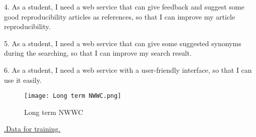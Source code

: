 \documentclass[
10pt, %
a4paper, %
oneside, %
headinclude,footinclude, %
BCOR5mm, %
]{scrartcl}
\begin{document}
4. As a student, I need a web service that can give feedback and suggest some good reproducibility articles as references, so that I can improve my article reproducibility.

5. As a student, I need a web service that can give some suggested synonyms during the searching, so that I can improve my search result.

6. As a student, I need a web service with a user-friendly interface, so that I can use it easily.

\begin{figure}[h]
    \centering
    \texttt{[image: Long term NWWC.png]}
    \caption{Long term NWWC}
    \label{fig:Long term NWWC}
\end{figure}
\newpage


\href{https://www.dropbox.com/home/NordlingLab_Course_ScientificInformation/Team_Freshman/Literature\%20review\%20on\%20assessments\%20of\%20reproducibility}{.Data for training.}


\renewcommand{\refname}{\spacedlowsmallcaps{References}} %




\end{document}
